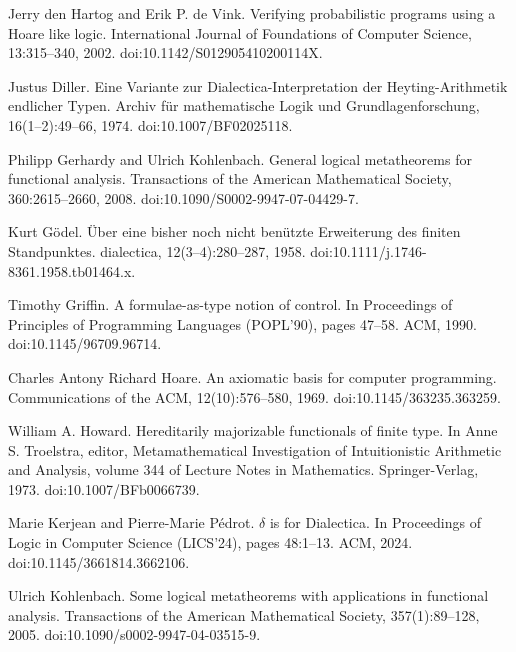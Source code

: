 \par\noindent  [9]  Jerry den Hartog and Erik P. de Vink.  Verifying probabilistic programs using a Hoare like logic.  International Journal of Foundations of Computer Science, 13:315–340, 2002.  doi:10.1142/S012905410200114X.  
 
\par\noindent  [10]  Justus Diller.  Eine Variante zur Dialectica-Interpretation der Heyting-Arithmetik endlicher Typen.  Archiv für mathematische Logik und Grundlagenforschung, 16(1–2):49–66, 1974.  doi:10.1007/BF02025118.  
 
\par\noindent  [11]  Philipp Gerhardy and Ulrich Kohlenbach.  General logical metatheorems for functional analysis.  Transactions of the American Mathematical Society, 360:2615–2660, 2008.  doi:10.1090/S0002-9947-07-04429-7.  
 
\par\noindent  [12]  Kurt Gödel.  Über eine bisher noch nicht benützte Erweiterung des finiten Standpunktes.  dialectica, 12(3–4):280–287, 1958.  doi:10.1111/j.1746-8361.1958.tb01464.x.  
 
\par\noindent  [13]  Timothy Griffin.  A formulae-as-type notion of control.  In Proceedings of Principles of Programming Languages (POPL’90), pages 47–58. ACM, 1990.  doi:10.1145/96709.96714.  
 
\par\noindent  [14]  Charles Antony Richard Hoare.  An axiomatic basis for computer programming.  Communications of the ACM, 12(10):576–580, 1969.  doi:10.1145/363235.363259.  
 
\par\noindent  [15]  William A. Howard.  Hereditarily majorizable functionals of finite type.  In Anne S. Troelstra, editor, Metamathematical Investigation of Intuitionistic Arithmetic and Analysis, volume 344 of Lecture Notes in Mathematics. Springer-Verlag, 1973.  doi:10.1007/BFb0066739.  
 
\par\noindent  [16]  Marie Kerjean and Pierre-Marie Pédrot.  $\delta$ is for Dialectica.  In Proceedings of Logic in Computer Science (LICS’24), pages 48:1–13. ACM, 2024.  doi:10.1145/3661814.3662106.  
 
\par\noindent  [17]  Ulrich Kohlenbach.  Some logical metatheorems with applications in functional analysis.  Transactions of the American Mathematical Society, 357(1):89–128, 2005.  doi:10.1090/s0002-9947-04-03515-9.  
 
